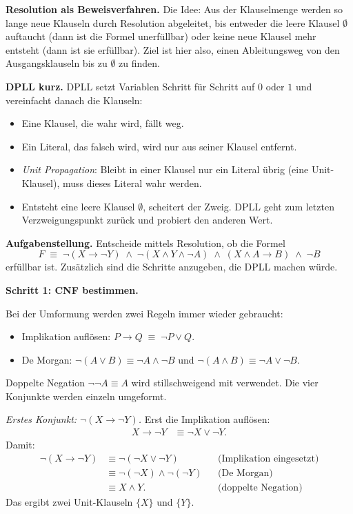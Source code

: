 \documentclass[a4paper,12pt]{article}
\begin{document}
\medskip
\textbf{Resolution als Beweisverfahren.}
Die Idee: Aus der Klauselmenge werden so lange neue Klauseln durch
Resolution abgeleitet, bis entweder die leere Klausel $\emptyset$
auftaucht (dann ist die Formel unerf\"ullbar) oder keine neue Klausel
mehr entsteht (dann ist sie erf\"ullbar). Ziel ist hier also, einen
Ableitungsweg von den Ausgangsklauseln bis zu $\emptyset$ zu finden.

\medskip
\textbf{DPLL kurz.}
DPLL setzt Variablen Schritt f\"ur Schritt auf $0$ oder $1$ und
vereinfacht danach die Klauseln:
\begin{itemize}[nosep]
\item Eine Klausel, die wahr wird, f\"allt weg.
\item Ein Literal, das falsch wird, wird nur aus seiner Klausel entfernt.
\item \emph{Unit Propagation}: Bleibt in einer Klausel nur ein Literal
      \"ubrig (eine Unit-Klausel), muss dieses Literal wahr werden.
\item Entsteht eine leere Klausel $\emptyset$, scheitert der Zweig. DPLL
      geht zum letzten Verzweigungspunkt zur\"uck und probiert den
      anderen Wert.
\end{itemize}

\medskip
\textbf{Aufgabenstellung.}
Entscheide mittels Resolution, ob die Formel
\[
F \;\equiv\; \neg(X \to \neg Y)
\;\wedge\; \neg(X \wedge Y \wedge \neg A)
\;\wedge\; (X \wedge A \to B)
\;\wedge\; \neg B
\]
erf\"ullbar ist. Zus\"atzlich sind die Schritte anzugeben, die DPLL
machen w\"urde.

\bigskip
\textbf{Schritt 1: CNF bestimmen.}

Bei der Umformung werden zwei Regeln immer wieder gebraucht:
\begin{itemize}[nosep]
\item Implikation aufl\"osen: $P \to Q \;\equiv\; \neg P \vee Q$.
\item De Morgan: $\neg(A \vee B) \equiv \neg A \wedge \neg B$ und
      $\neg(A \wedge B) \equiv \neg A \vee \neg B$.
\end{itemize}
Doppelte Negation $\neg\neg A \equiv A$ wird stillschweigend mit verwendet.
Die vier Konjunkte werden einzeln umgeformt.

\medskip
\emph{Erstes Konjunkt: $\neg(X \to \neg Y)$.}
Erst die Implikation aufl\"osen:
\begin{align*}
X \to \neg Y &\equiv \neg X \vee \neg Y.
\end{align*}
Damit:
\begin{align*}
\neg(X \to \neg Y)
&\equiv \neg(\neg X \vee \neg Y)
&& \text{(Implikation eingesetzt)} \\
&\equiv \neg(\neg X) \wedge \neg(\neg Y)
&& \text{(De Morgan)} \\
&\equiv X \wedge Y.
&& \text{(doppelte Negation)}
\end{align*}
Das ergibt zwei Unit-Klauseln $\{X\}$ und $\{Y\}$.
\end{document}
